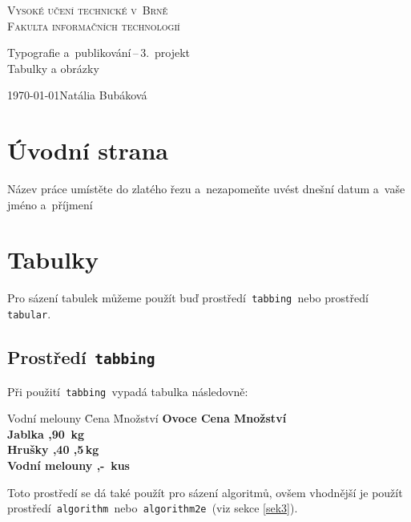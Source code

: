 \documentclass[11pt]{article}
\begin{document}
\begin{titlepage}
    \begin{center}
        {\Huge\scshape Vysoké učení technické v~Brně \\
        \huge\vspace{0.4em}Fakulta informačních technologií}
        
        {\LARGE Typografie a~publikování\,--\,3.~projekt \\
        \Huge\vspace{0.3em}Tabulky a obrázky}
    \end{center}
    
    {\Large \today \hfill Natália Bubáková}
\end{titlepage}




\section{Úvodní strana}

Název práce umístěte do zlatého řezu a~nezapomeňte uvést dnešní datum a~vaše jméno a~příjmení

\section{Tabulky}
Pro sázení tabulek můžeme použít buď prostředí\texttt{ tabbing }nebo prostředí\texttt{ tabular}.

\subsection{Prostředí\texttt{ tabbing}}
Při použití\texttt{ tabbing }vypadá tabulka následovně:

\begin{tabbing}
  Vodní melouny \quad \= Cena \quad      \= Množství  \quad  \kill
  \bfseries Ovoce     \> \bfseries Cena  \> \bfseries Množství \\
  Jablka              ,90           \,kg     \\
  Hrušky              ,40           ,5\,kg   \\
  Vodní melouny       ,-            \,kus    \\
\end{tabbing}

\noindent Toto prostředí se dá také použít pro sázení algoritmů, ovšem vhodnější je použít prostředí\texttt{ algorithm }nebo\texttt{ algorithm2e }(viz sekce \ref{sek3}).
\end{document}
